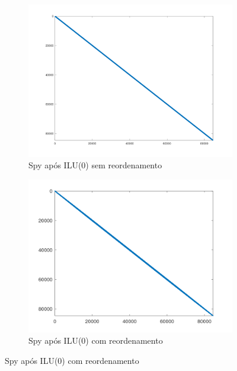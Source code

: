 \begin{figure}[H]
    \centering
    \begin{subfigure}[t]{0.4\linewidth}
         \centering
         \includegraphics[width=\textwidth]{images/epb3_spyM_ILU(0)_sem.png}
         \caption{Spy após ILU(0) sem reordenamento}
         \label{fig:epb-ILU0-sem}
    \end{subfigure}
    \quad
    \begin{subfigure}[t]{0.4\linewidth}
         \centering
         \includegraphics[width=\textwidth]{images/epb3_spyM_ILU(0)_com.png}
         \caption{Spy após ILU(0) com reordenamento}
         \label{fig:epb-ILU0-com}
    \end{subfigure}
    \par\bigskip

\end{figure}

